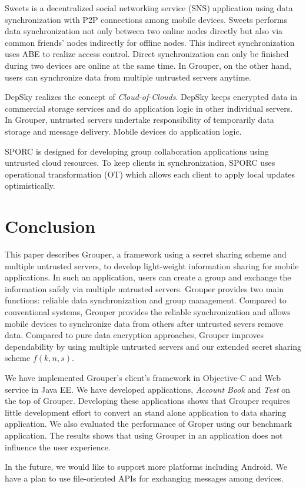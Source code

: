 \documentclass[twocolumn,10pt]{article}
\begin{document}
Sweets\cite{sweets} is a decentralized social networking service (SNS) application using data synchronization with P2P connections among mobile devices. 
Sweets performs data synchronization not only between two online nodes directly but also via common friends' nodes indirectly for offline nodes.
This indirect synchronization uses ABE to realize access control.
Direct synchronization can only be finished during two devices are online at the same time. 
In Grouper, on the other hand, users can synchronize data from multiple untrusted servers anytime.

DepSky\cite{bessani2013depsky} realizes the concept of \emph{Cloud-of-Clouds}.  
DepSky keeps encrypted data in commercial storage services and do application logic in other individual servers.
In Grouper, untrusted servers undertake responsibility of temporarily data storage and message delivery.
Mobile devices do application logic.

SPORC\cite{feldman2010sporc} is designed for developing group collaboration applications using untrusted cloud resources.
To keep clients in synchronization, SPORC uses operational transformation (OT) which allows each client to apply local updates optimistically.

\section{Conclusion}

This paper describes Grouper, a framework using a secret sharing scheme and multiple untrusted servers, to develop light-weight information sharing for mobile applications.
In such an application, users can create a group and exchange the information safely via multiple untrusted servers.
Grouper provides two main functions: reliable data synchronization and group management.
Compared to conventional systems, Grouper provides the reliable synchronization and allows mobile devices to synchronize data from others after untrusted severs remove data.
Compared to pure data encryption approaches, Grouper improves dependability by using multiple untrusted servers and our extended secret sharing scheme $f(k, n, s)$.

We have implemented Grouper's client's framework in Objective-C and Web service in Java EE. 
We have developed applications, \emph{Account Book} and \emph{Test} on the top of Grouper.
Developing these applications shows that Grouper requires little development effort to convert an stand alone application to data sharing application.
We also evaluated the performance of Groper using our benchmark application.
The results shows that using Grouper in an application does not influence the user experience.

In the future, we would like to support more platforms including Android.
We have a plan to use file-oriented APIs for exchanging messages among devices.


{
	\footnotesize
	
}
\end{document}
